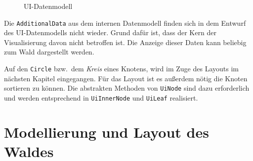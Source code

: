 \begin{figure}[htb]
\caption{UI-Datenmodell}
\label{fig:ui-model}
\end{figure}

Die \texttt{AdditionalData} aus dem internen Datenmodell finden sich in dem Entwurf des UI-Datenmodells nicht wieder. Grund dafür ist, dass der Kern der Visualisierung davon nicht betroffen ist. Die Anzeige dieser Daten kann beliebig zum Wald dargestellt werden.

Auf den \texttt{Circle} bzw.\ dem \textit{Kreis} eines Knotens, wird im Zuge des Layouts im nächsten Kapitel eingegangen. Für das Layout ist es außerdem nötig die Knoten sortieren zu können. Die abstrakten Methoden von \texttt{UiNode} sind dazu erforderlich und werden entsprechend in \texttt{UiInnerNode} und \texttt{UiLeaf} realisiert.

\chapter{Modellierung und Layout des Waldes}
\label{ch:layout}

